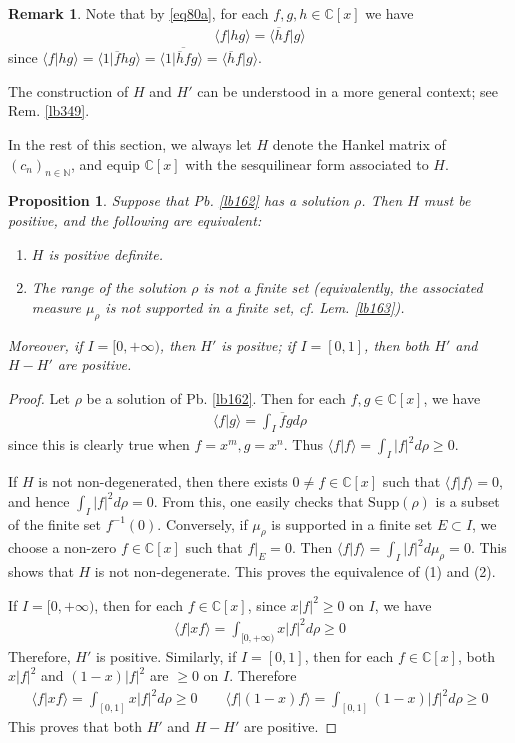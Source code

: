 \documentclass[12pt,b5paper,notitlepage]{article}
\theoremstyle{definition}
\newtheorem{rem}[df]{Remark}
\theoremstyle{plain}
\newtheorem{pp}[df]{Proposition}
\newcommand{\ovl}{\overline}
\newcommand{\bk}[1]{\langle {#1}\rangle}
\newcommand{\bigbk}[1]{\big\langle {#1}\big\rangle}
\newcommand{\Cbb}{\mathbb C}
\newcommand{\Nbb}{\mathbb N}
\newcommand{\Supp}{\mathrm{Supp}}
\numberwithin{equation}{section}
\begin{document}
\begin{rem}\label{lb166}
Note that by \eqref{eq80a}, for each $f,g,h\in\Cbb[x]$ we have
\begin{align}
\bigbk{f\big|hg}=\bigbk{\ovl hf\big|g}
\end{align}
since $\bk{f|hg}=\bk{1|\ovl fhg}=\bk{1|\ovl{\ovl hf}g}=\bk{\ovl hf|g}$.
\end{rem}


The construction of $H$ and $H'$ can be understood in a more general context; see Rem. \ref{lb349}.



In the rest of this section, we always let $H$ denote the Hankel matrix of $(c_n)_{n\in\Nbb}$, and equip $\Cbb[x]$ with the sesquilinear form associated to $H$.


\begin{pp}\label{lb168}
Suppose that Pb. \ref{lb162} has a solution $\rho$. Then $H$ must be positive, and the following are equivalent:
\begin{enumerate}[label=(\arabic*)]
\item $H$ is positive definite.
\item The range of the solution $\rho$ is not a finite set (equivalently, the associated measure $\mu_\rho$ is not supported in a finite set, cf. Lem. \ref{lb163}).
\end{enumerate}
Moreover, if $I=[0,+\infty)$, then $H'$ is positve; if $I=[0,1]$, then both $H'$ and $H-H'$ are positive.
\end{pp}


\begin{proof}
Let $\rho$ be a solution of Pb. \ref{lb162}. Then for each $f,g\in\Cbb[x]$, we have
\begin{align}\label{eq101}
\bk{f|g}= \int_I \ovl f gd\rho
\end{align}
since this is clearly true when $f=x^m,g=x^n$. Thus $\bk{f|f}=\int_I |f|^2d\rho\geq0$. 

If $H$ is not non-degenerated, then there exists $0\neq f\in\Cbb[x]$ such that $\bk{f|f}=0$, and hence $\int_I|f|^2d\rho=0$. From this, one easily checks that $\Supp(\rho)$ is a subset of the finite set $f^{-1}(0)$. Conversely, if $\mu_\rho$ is supported in a finite set $E\subset I$, we choose a non-zero $f\in\Cbb[x]$ such that $f|_E=0$. Then $\bk{f|f}=\int_I|f|^2d\mu_\rho=0$. This shows that $H$ is not non-degenerate. This proves the equivalence of (1) and (2).

If $I=[0,+\infty)$, then for each $f\in\Cbb[x]$, since $x|f|^2\geq0$ on $I$, we have
\begin{align*}
\bk{f|xf}=\int_{[0,+\infty)}x|f|^2d\rho\geq0
\end{align*}
Therefore, $H'$ is positive. Similarly, if $I=[0,1]$, then for each $f\in\Cbb[x]$, both $x|f|^2$ and $(1-x)|f|^2$ are $\geq0$ on $I$. Therefore
\begin{align*}
\bk{f|xf}=\int_{[0,1]}x|f|^2d\rho\geq0\qquad  \bk{f|(1-x)f}=\int_{[0,1]}(1-x)|f|^2d\rho\geq0
\end{align*}
This proves that both $H'$ and $H-H'$ are positive. 
\end{proof}
\end{document}

